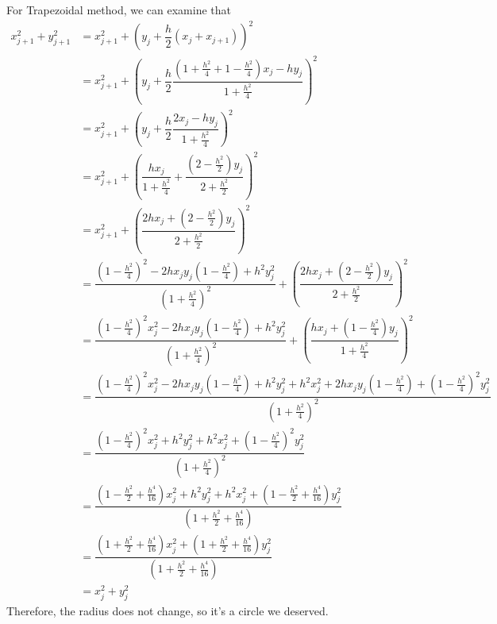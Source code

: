 \documentclass{article}
\begin{document}
\begin{enumerate}
  For Trapezoidal method, we can examine that \begin{align*}
  x_{j+1}^2+y_{j+1}^2&= x_{j+1}^2+\left( y_j+\dfrac{h}{2}(x_j+x_{j+1})\right)^2\\
  &= x_{j+1}^2+\left( y_j+\dfrac{h}{2}\dfrac{(1+\frac{h^2}{4}+1-\frac{h^2}{4})x_j-hy_j}{1+\frac{h^2}{4}}\right)^2\\
    &= x_{j+1}^2+\left( y_j+\dfrac{h}{2}\dfrac{2x_j-hy_j}{1+\frac{h^2}{4}}\right)^2\\
        &= x_{j+1}^2+\left(\dfrac{hx_j}{1+\frac{h^2}{4}}+\dfrac{(2-\frac{h^2}{2})y_j}{2+\frac{h^2}{2}}\right)^2\\
   &= x_{j+1}^2+\left(\dfrac{2hx_j+(2-\frac{h^2}{2})y_j}{2+\frac{h^2}{2}}\right)^2\\
    &= \dfrac{(1-\frac{h^2}{4})^2 -2hx_jy_j(1-\frac{h^2}{4})+h^2y_j^2}{(1+\frac{h^2}{4})^2}+\left(\dfrac{2hx_j+(2-\frac{h^2}{2})y_j}{2+\frac{h^2}{2}}\right)^2\\
      &= \dfrac{(1-\frac{h^2}{4})^2x_j^2 -2hx_jy_j(1-\frac{h^2}{4})+h^2y_j^2}{(1+\frac{h^2}{4})^2}+\left(\dfrac{hx_j+(1-\frac{h^2}{4})y_j}{1+\frac{h^2}{4}}\right)^2\\
            &= \dfrac{(1-\frac{h^2}{4})^2x_j^2 -2hx_jy_j(1-\frac{h^2}{4})+h^2y_j^2+h^2x_j^2+2hx_jy_j(1-\frac{h^2}{4})+(1-\frac{h^2}{4})^2y_j^2}{(1+\frac{h^2}{4})^2}\\
    &= \dfrac{(1-\frac{h^2}{4})^2x_j^2 +h^2y_j^2+h^2x_j^2+(1-\frac{h^2}{4})^2y_j^2}{(1+\frac{h^2}{4})^2}\\
    &= \dfrac{(1-\frac{h^2}{2}+\frac{h^4}{16})x_j^2 +h^2y_j^2+h^2x_j^2+(1-\frac{h^2}{2}+\frac{h^4}{16})y_j^2}{(1+\frac{h^2}{2}+\frac{h^4}{16})}\\
       &= \dfrac{(1+\frac{h^2}{2}+\frac{h^4}{16})x_j^2 +(1+\frac{h^2}{2}+\frac{h^4}{16})y_j^2}{(1+\frac{h^2}{2}+\frac{h^4}{16})}\\
       &=x_j^2+y_j^2
  \end{align*}
    Therefore, the radius does not change, so it's a circle we deserved.
  

\end{enumerate}
\end{document}
